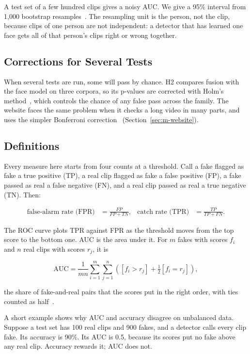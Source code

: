 A test set of a few hundred clips gives a noisy AUC. We give a 95\% interval
from 1,000 bootstrap resamples~\cite{bootstrap}. The resampling unit is the
person, not the clip, because clips of one person are not independent: a
detector that has learned one face gets all of that person's clips right or
wrong together.

\subsection{Corrections for Several Tests}

When several tests are run, some will pass by chance. H2 compares fusion with
the face model on three corpora, so its p-values are corrected with Holm's
method~\cite{holm}, which controls the chance of any false pass across the
family. The website faces the same problem when it checks a long video in many
parts, and uses the simpler Bonferroni correction~\cite{dunn}
(Section~\ref{sec:m-website}).

\subsection{Definitions}

Every measure here starts from four counts at a threshold. Call a fake
flagged as fake a true positive (TP), a real clip flagged as fake a false
positive (FP), a fake passed as real a false negative (FN), and a real clip
passed as real a true negative (TN). Then:

\begin{align}
    \text{false-alarm rate (FPR)} &= \frac{FP}{FP + TN}, &
    \text{catch rate (TPR)} &= \frac{TP}{TP + FN}.
\end{align}

The ROC curve plots TPR against FPR as the threshold moves from the top score
to the bottom one. AUC is the area under it. For $m$ fakes with scores $f_i$
and $n$ real clips with scores $r_j$, it is

\begin{equation}
    \text{AUC} = \frac{1}{mn} \sum_{i=1}^{m} \sum_{j=1}^{n}
    \left( [f_i > r_j] + \tfrac{1}{2} [f_i = r_j] \right),
\end{equation}

the share of fake-and-real pairs that the scores put in the right order, with
ties counted as half~\cite{hanley}.

A short example shows why AUC and accuracy disagree on unbalanced data.
Suppose a test set has 100 real clips and 900 fakes, and a detector calls
every clip fake. Its accuracy is 90\%. Its AUC is 0.5, because its scores put
no fake above any real clip. Accuracy rewards it; AUC does not.

